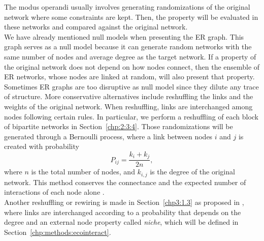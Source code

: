The modus operandi usually involves generating
randomizations of the original network where
some constraints are kept. Then, the property
will be evaluated in these networks and compared
against the original network.\\

We have already mentioned null models when presenting the ER
graph. This graph serves as a null model because it can
generate random networks with the same number of
nodes and average degree as the target network. If a
property of the original network does not depend on how
nodes connect, then the ensemble of ER networks, whose nodes
are linked at random, will also present that property. \\

Sometimes ER graphs are too disruptive
as null model since they dilute any trace of
structure. More conservative alternatives include
reshuffling the links and the weights of the original network. When reshuffling, links are interchanged among nodes
following certain rules. In particular, we
perform a reshuffling of each block
of bipartite networks in Section~\ref{chp:2:3:4}.
Those randomizations will be generated
through a Bernoulli process,
where a link between nodes $i$ and $j$ is created with probability
\begin{equation}
    P_{ij} = \frac{k_{i} + k_{j}}{2n},
\end{equation}
where $n$ is the total number of nodes, and $k_{i,j}$ is the degree of the original network.
This method conserves the connectance and the expected number of interactions of each node alone \cite{BiMat}. \\

Another reshuffling or rewiring is made in Section~\ref{chp3:1.3} as proposed in \cite{suweis2013emergence}, where links are interchanged according to a probability that depends on the degree and an external node property called \textit{niche}, which will be defined in Section~\ref{chp:methods:ecointeract}.

